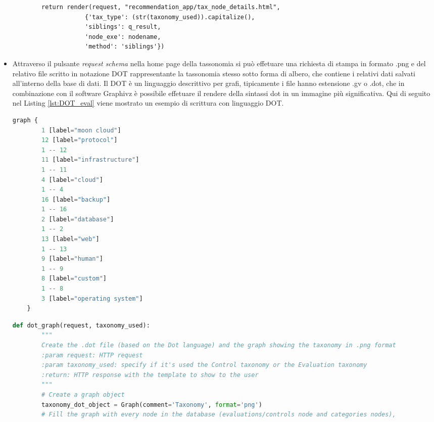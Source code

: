 \begin{itemize}
\begin{lstlisting}
        return render(request, "recommendation_app/tax_node_details.html",
                    {'tax_type': (str(taxonomy_used)).capitalize(),
                    'siblings': q_result,
                    'node_exe': nodename,
                    'method': 'siblings'})
    \end{lstlisting}
    \item Attraverso il pulsante \textit{request schema} nella home page della tassonomia si può effetuare una richiesta di stampa in formato .png e del 
    relativo file scritto in notazione DOT rappresentante la tassonomia stesso sotto forma di albero, che contiene i relativi dati salvati all'interno 
    della base di dati.\hfill\break
    Il DOT è un linguaggio descrittivo per grafi, tipicamente i file hanno estensione .gv o .dot, che in combinazione con il software Graphivz è possibile 
    effetuare il rendere della sintassi dot in un immagine più significativa. Qui di seguito nel Listing \ref{lst:DOT_eval} viene mostrato un esempio di 
    scrittura con linguaggio DOT.
    \lstset{style=python_code_style}
    \begin{lstlisting}[language=Python, label=lst:DOT_eval, caption={Codice parziale utilizzato per realizzare lo schema della tassonomia
        per le Evaluation.}]
    graph {
        1 [label="moon cloud"]
        12 [label="protocol"]
        1 -- 12
        11 [label="infrastructure"]
        1 -- 11
        4 [label="cloud"]
        1 -- 4
        16 [label="backup"]
        1 -- 16
        2 [label="database"]
        1 -- 2
        13 [label="web"]
        1 -- 13
        9 [label="human"]
        1 -- 9
        8 [label="custom"]
        1 -- 8
        3 [label="operating system"]
    }
    \end{lstlisting}
    \lstset{style=python_code_style}
    \begin{lstlisting}[language=Python, label=lst:view_DOT_eval, caption={Codice utilizzato per la realizzazione del
        file .dot e relativa immagine .png.}]
    def dot_graph(request, taxonomy_used):
        """
        Create the .dot file (based on the Dot language) and the graph showing the taxonomy in .png format
        :param request: HTTP request
        :param taxonomy_used: specify if it's used the Control taxonomy or the Evaluation taxonomy
        :return: HTTP response with the template to show to the user
        """
        # Create a graph object
        taxonomy_dot_object = Graph(comment='Taxonomy', format='png')
        # Fill the graph with every node in the database (evaluations/controls node and categories nodes), 

\end{lstlisting}
\end{itemize}
